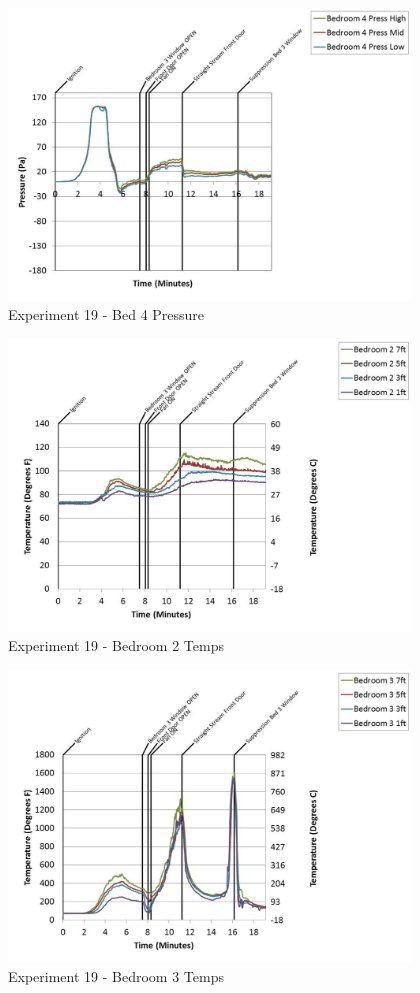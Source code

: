 \documentclass{article}
\begin{document}
\begin{appendices}
	\begin{figure}[h!]
		\centering
		\includegraphics[height=3.05in]{0_Images/Results_Charts/Exp_19_Charts/Bed4Pressure.pdf}
		\caption{Experiment 19 - Bed 4 Pressure}
	\end{figure}
 
	\clearpage

	\begin{figure}[h!]
		\centering
		\includegraphics[height=3.05in]{0_Images/Results_Charts/Exp_19_Charts/Bedroom2Temps.pdf}
		\caption{Experiment 19 - Bedroom 2 Temps}
	\end{figure}
 

	\begin{figure}[h!]
		\centering
		\includegraphics[height=3.05in]{0_Images/Results_Charts/Exp_19_Charts/Bedroom3Temps.pdf}
		\caption{Experiment 19 - Bedroom 3 Temps}
	\end{figure}
 

\end{appendices}
\end{document}
